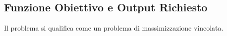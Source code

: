 \documentclass{cisXXX} %
\begin{document}
                                                                                                                                              
    \subsection{Funzione Obiettivo e Output Richiesto}                                                                                        
                                                                                                                                              
    Il problema si qualifica come un problema di massimizzazione vincolata.                                                                   
                                                                                                                                              
\end{document}
